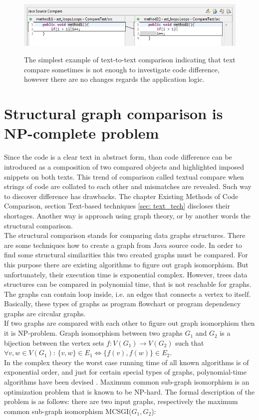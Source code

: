 \documentclass{report}
\begin{document}
\begin{figure}[h]
  \centering
  \includegraphics[scale=0.6]{Figures/introduction/intro-code-example}\\[0.1cm]
  \caption[Simple textual comparison example in Eclipse compare editor]{The simplest example of text-to-text comparison indicating that text compare sometimes is not enough to investigate code difference, however there are no changes regards the application logic.}
  \label{fig:intro-code-example}
\end{figure}

\section{Structural graph comparison is NP-complete problem}

Since the code is a clear text in abstract form, than code difference can be introduced as a composition of two compared objects and highlighted imposed snippets on both texts. This trend of comparison called textual compare when strings of code are collated to each other and mismatches are revealed. Such way to discover difference has drawbacks. The chapter Existing Methods of Code Comparison, section Text-based techniques \ref{sec: text_tech} discloses their shortages. Another way is approach using graph theory, or by another words the structural comparison.
\\
The structural comparison stands for comparing data graphs structures. There are some techniques how to create a graph from Java source code. In order to find some structural similarities this two created graphs must be compared. For this purpose there are existing algorithms to figure out graph isomorphism. But unfortunately, their execution time is exponential complex. However, trees data structures can be compared in polynomial time, that is not reachable for graphs. The graphs can contain loop inside, i.e. an edges that connects a vertex to itself. Basically, these types of graphs as program flowchart or program dependency graphs are circular graphs. 
\\
If two graphs are compared with each other to figure out graph isomorphism then it is NP-problem. Graph isomorphism between two graphs $G_{1}$ and $G_{2}$ is a bijection between the vertex sets $f: V(G_{1}) \rightarrow V(G_{2}) $ such that \\ $ \forall v, w \in V(G_{1})$:  $ \{v,w\} \in E_{1} \iff \{ f(v), f(w)\} \in E_{2}$. 
\\
In the complex theory the worst case running time of all known algorithms is of exponential order, and just for certain special types of graphs, polynomial-time algorithms have been devised \cite{graph_isomorphism_is}. Maximum common sub-graph isomorphism is an optimization problem that is known to be NP-hard. The formal description of the problem is as follows:
there are two input graphs, respectively the maximum common sub-graph isomorphism MCSGI($ G_{1}, G_{2}$):
\end{document}
